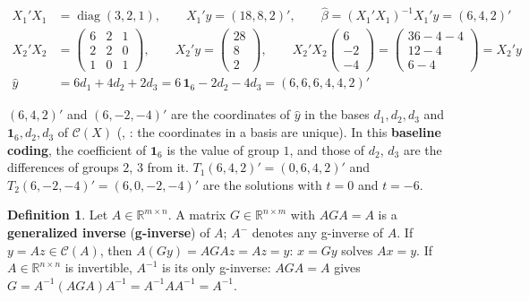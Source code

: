 \documentclass[12pt]{article}
\newcommand{\R}{\mathbb R}
\newcommand{\one}{\mathbf 1}
\DeclareMathOperator{\diag}{diag}
\theoremstyle{definition}
\newtheorem{definition}[theorem]{Definition}
\newcommand{\boardtop}{\vspace*{-\abovedisplayskip}}
\begin{document}
\begin{board}[\(X_1\), \(X_2\) have full column rank and \(\mathcal C(X_1)=\mathcal C(X_2)=\mathcal C(X)\)
(Theorem~\ref{h-thm-oneway}(c)): one solution each (Theorem~\ref{h-thm-normal}(b)), the same \(\hat y\)
(Theorem~\ref{h-thm-ls}(b)):]
\boardtop
\begin{align*}
X_1'X_1&=\diag(3,2,1),\qquad X_1'y=(18,8,2)',\qquad\hat\beta=(X_1'X_1)^{-1}X_1'y=(6,4,2)'\\
X_2'X_2&=\begin{pmatrix}6&2&1\\2&2&0\\1&0&1\end{pmatrix},\qquad X_2'y=\begin{pmatrix}28\\8\\2\end{pmatrix},\qquad
X_2'X_2\begin{pmatrix}6\\-2\\-4\end{pmatrix}=\begin{pmatrix}36-4-4\\12-4\\6-4\end{pmatrix}=X_2'y\\
\hat y&=6d_1+4d_2+2d_3=6\,\one_6-2d_2-4d_3=(6,6,6,4,4,2)'
\end{align*}
\end{board}
\((6,4,2)'\) and \((6,-2,-4)'\) are the coordinates of \(\hat y\) in the bases \(d_1,d_2,d_3\) and \(\one_6,d_2,d_3\) of
\(\mathcal C(X)\) (, : the coordinates in a basis are unique). In this \textbf{baseline coding}, the coefficient of \(\one_6\) is the value of group
\(1\), and those of \(d_2\), \(d_3\) are the differences of groups \(2\), \(3\) from it. \(T_1(6,4,2)'=(0,6,4,2)'\) and
\(T_2(6,-2,-4)'=(6,0,-2,-4)'\) are the solutions with \(t=0\) and \(t=-6\).

\begin{definition}\label{h-def-ginverse}
Let \(A\in\R^{m\times n}\). A matrix \(G\in\R^{n\times m}\) with \(AGA=A\) is a \textbf{generalized inverse}
(\textbf{g-inverse}) of \(A\); \(A^-\) denotes any g-inverse of \(A\). If \(y=Az\in\mathcal C(A)\), then
\(A(Gy)=AGAz=Az=y\): \(x=Gy\) solves \(Ax=y\). If \(A\in\R^{n\times n}\) is invertible, \(A^{-1}\) is its only
g-inverse: \(AGA=A\) gives \(G=A^{-1}(AGA)A^{-1}=A^{-1}AA^{-1}=A^{-1}\).
\end{definition}
\end{document}
